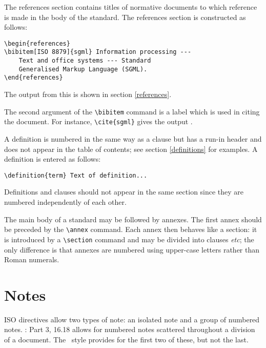 The references section contains titles of normative documents to which
reference is made in the body of the standard.
The references section is constructed as follows:
\begin{verbatim}
\begin{references}
\bibitem[ISO 8879]{sgml} Information processing ---
    Text and office systems --- Standard
    Generalised Markup Language (SGML).
\end{references}
\end{verbatim}
The output from this is shown in section \ref{references}.

The second argument of the \verb|\bibitem| command is a label which is used
in citing the document.
For instance, \verb|\cite{sgml}| gives the output \cite{sgml}.

\label{div.special.def}
A definition is numbered in the same way as a clause but has a run-in
header and does not appear in the table of contents; see section
\ref{definitions} for examples.
A definition is entered as follows:
\begin{verbatim}
\definition{term} Text of definition...
\end{verbatim}

\begin{note}
Definitions and clauses should not appear in the same section
since they are numbered independently of each other.
\end{note}

The main body of a standard may be followed by annexes.
The first annex should be preceded by the \verb|\annex| command.
Each annex then behaves like a section: it is introduced by a
\verb|\section| command and may be divided into clauses {\it etc};
the only difference is that annexes are numbered using upper-case
letters rather than Roman numerals.

\section{Notes}
ISO directives allow two types of note: an isolated note and a group of
numbered notes.
\cite{bs0}: Part 3, 16.18 allows for numbered notes scattered throughout
a division of a document.
The \iso\ style provides for the first two of these, but not the last.

